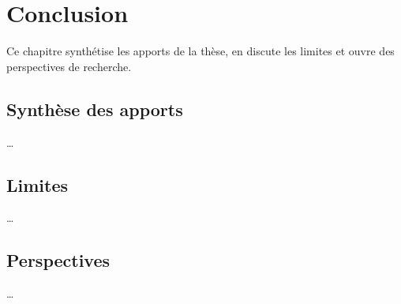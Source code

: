 \chapter{Conclusion}
\label{chap:conclusion}

Ce chapitre synthétise les apports de la thèse, en discute les limites
et ouvre des perspectives de recherche.

\section{Synthèse des apports}
\dots

\section{Limites}
\dots

\section{Perspectives}
\dots

